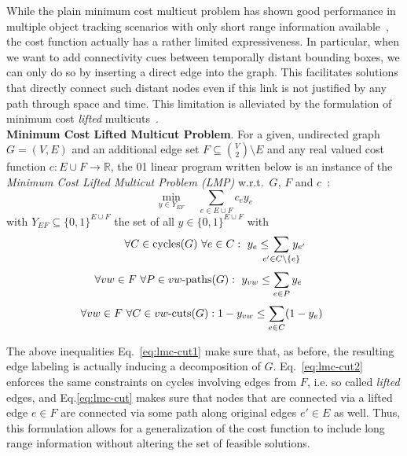 While the plain minimum cost multicut problem has shown good performance in multiple object tracking scenarios with only short range information available~\cite{tang2016multi}, the cost function actually has a rather limited expressiveness. 
In particular, when we want to add connectivity cues between temporally distant bounding boxes, we can only do so by inserting a direct edge into the graph. 
This facilitates solutions that directly connect such distant nodes even if this link is not justified by any path through space and time. 
This limitation is alleviated by the formulation of minimum cost \emph{lifted} multicuts~\cite{keupericcv}.\\

\noindent\textbf{Minimum Cost Lifted Multicut Problem}.
For a given, undirected graph $G = (V, E)$ and an additional edge set $F\subseteq \binom{V}{2} \setminus E$ and any  real valued cost function $c: E \cup F \to \mathbb{R}$,
the 01 linear program written below is an instance of the
\emph{Minimum Cost Lifted Multicut Problem (LMP)}
w.r.t.~$G$, $F$ and $c$~\cite{keupericcv}:
%
\begin{equation}
\displaystyle\min_{y \in Y_{EF}} 
    \quad \sum_{e \in E \cup F} c_e y_e
    \label{eq:lmc}
\end{equation}
%
with $Y_{EF} \subseteq \{0,1\}^{E \cup F}$ the set of all $y \in \{0,1\}^{E \cup F}$ with
%
\begin{equation}
 \qquad\forall C \in \textnormal{cycles}(G)\ \forall e \in C:\ 
    y_e \leq \hspace{-2ex} \sum_{e' \in C \setminus \{e\}} \hspace{-2ex} y_{e'} 
\label{eq:lmc-cut1}
\end{equation}
\begin{equation}
 \forall vw \in F\ \forall P \in vw\textnormal{-paths}(G):\ 
    y_{vw} \leq \sum_{e \in P} y_e \quad
\label{eq:lmc-cut2}\end{equation}
\begin{equation}
 \hspace{-1ex} \forall vw \in F\ \forall C \in vw\textnormal{-cuts}(G):
    1 - y_{vw} \leq \sum_{e \in C} (1 - y_e) 
\label{eq:lmc-cut}
   \end{equation}

The above inequalities Eq.~\eqref{eq:lmc-cut1} make sure that, as before, the resulting edge labeling is actually inducing a decomposition of $G$. Eq.~\eqref{eq:lmc-cut2} enforces the same constraints on cycles involving edges from $F$, i.e. so called \emph{lifted} edges, and Eq.\eqref{eq:lmc-cut} makes sure that nodes that are connected via a lifted edge $e\in F$ are connected via some path along original edges  $e'\in E$ as well. 
Thus, this formulation allows for a generalization of the cost function to include long range information without altering the set of feasible solutions.\\

